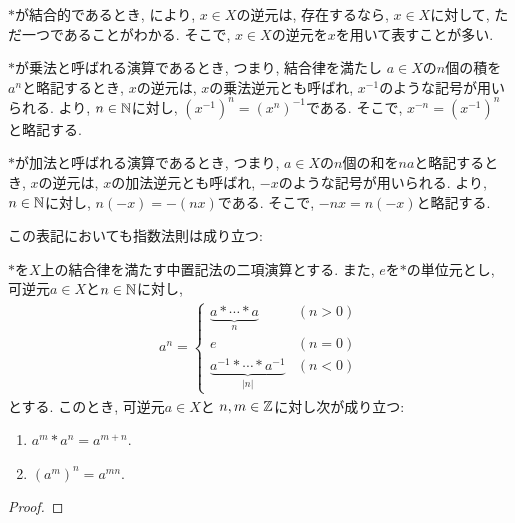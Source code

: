 \begin{remark}
\label{rem:uniq:inv}
  $\ast$が結合的であるとき,
  により,
  $x\in X$の逆元は, 存在するなら, $x\in X$に対して,
  ただ一つであることがわかる.
  そこで, $x\in X$の逆元を$x$を用いて表すことが多い.

  $\ast$が乗法と呼ばれる演算であるとき,
  つまり, 結合律を満たし
  $a\in X$の$n$個の積を$a^n$と略記するとき,
  $x$の逆元は,
  $x$の乗法逆元とも呼ばれ,
  $x^{-1}$のような記号が用いられる.
  より,
  $n\in\mathbb{N}$に対し,
  $(x^{-1})^n=(x^n)^{-1}$である.
  そこで, $x^{-n}=(x^{-1})^{n}$と略記する.

  $\ast$が加法と呼ばれる演算であるとき,
  つまり, $a\in X$の$n$個の和を$na$と略記するとき,
  $x$の逆元は,
  $x$の加法逆元とも呼ばれ,
  $-x$のような記号が用いられる.
  より,
  $n\in\mathbb{N}$に対し,
  $n(-x)=-(nx)$である.
  そこで, $-nx=n(-x)$と略記する.
\end{remark}

この表記においても指数法則は成り立つ:
\begin{prop}
  $\ast$を$X$上の結合律を満たす中置記法の二項演算とする.
  また, $e$を$\ast$の単位元とし,
  可逆元$a\in X$と$n\in\mathbb{N}$に対し,
  \begin{align*}
    a^n=
    \begin{cases}
      \underbrace{a\ast \cdots \ast a}_{n} & (n>0)\\
      e & (n=0)\\
      \underbrace{a^{-1}\ast \cdots \ast a^{-1}}_{|n|} & (n<0)
    \end{cases}
  \end{align*}
  とする.
  このとき,
  可逆元$a\in X$と
  $n,m\in\mathbb{Z}$に対し次が成り立つ:
  \begin{enumerate}
    \item $a^m\ast a^n=a^{m+n}$.
    \item $(a^m)^n=a^{mn}$.
  \end{enumerate}
\end{prop}
\begin{proof}\end{proof}

